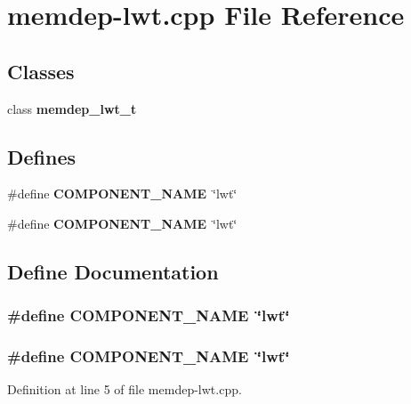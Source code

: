 \section{memdep-lwt.cpp File Reference}
\label{memdep-lwt_8cpp}
\subsection*{Classes}
\begin{CompactItemize}
\item 
class {\bf memdep\_\-lwt\_\-t}
\end{CompactItemize}
\subsection*{Defines}
\begin{CompactItemize}
\item 
\#define {\bf COMPONENT\_\-NAME}~\char`\"{}lwt\char`\"{}
\item 
\#define {\bf COMPONENT\_\-NAME}~\char`\"{}lwt\char`\"{}
\end{CompactItemize}


\subsection{Define Documentation}
\subsubsection[{COMPONENT\_\-NAME}]{\setlength{\rightskip}{0pt plus 5cm}\#define COMPONENT\_\-NAME~\char`\"{}lwt\char`\"{}}\label{zesto-memdep_8cpp_9146ade7ce24e3db226a973a59063892}


\subsubsection[{COMPONENT\_\-NAME}]{\setlength{\rightskip}{0pt plus 5cm}\#define COMPONENT\_\-NAME~\char`\"{}lwt\char`\"{}}\label{memdep-lwt_8cpp_9146ade7ce24e3db226a973a59063892}




Definition at line 5 of file memdep-lwt.cpp.